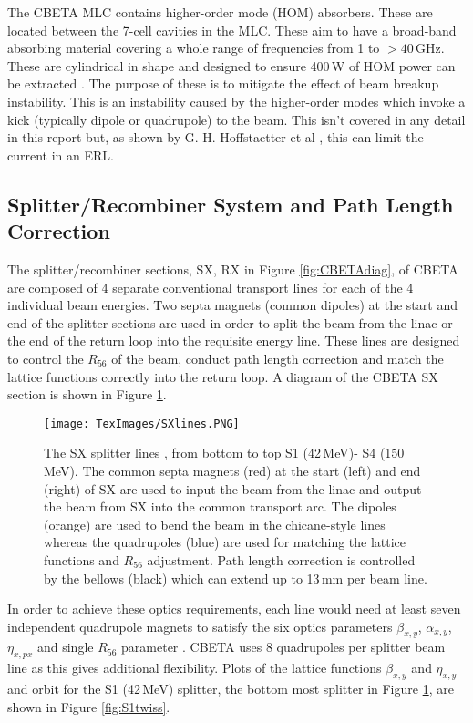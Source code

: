 \documentclass[11pt]{article}
\begin{document}
The CBETA MLC contains higher-order mode (HOM) absorbers. These are located between the 7-cell cavities in the MLC. These aim to have a broad-band absorbing material covering a whole range of frequencies from 1 to $> 40$\,GHz. These are cylindrical in shape and designed to ensure 400\,W of HOM power can be extracted \cite{CBETATDR}. The purpose of these is to mitigate the effect of beam breakup instability. This is an instability caused by the higher-order modes which invoke a kick (typically dipole or quadrupole) to the beam. This isn't covered in any detail in this report but, as shown by G. H. Hoffstaetter et al \cite{HoffstaetterBBU}, this can limit the current in an ERL.    

\subsection{Splitter/Recombiner System and Path Length Correction}

The splitter/recombiner sections, SX, RX in Figure \ref{fig:CBETAdiag}, of CBETA are composed of 4 separate conventional transport lines for each of the 4 individual beam energies. Two septa magnets (common dipoles) at the start and end of the splitter sections are used in order to split the beam from the linac or the end of the return loop into the requisite energy line. These lines are designed to control the $R_{56}$ of the beam, conduct path length correction and match the lattice functions correctly into the return loop. A diagram of the CBETA SX section is shown in Figure \ref{fig:SXlines}.

\begin{figure}[H]
\centering
\texttt{[image: TexImages/SXlines.PNG]}
\caption{\label{fig:SXlines} The SX splitter lines \cite{CBETATDR}, from bottom to top S1 (42\,MeV)- S4 (150\,MeV). The common septa magnets (red) at the start (left) and end (right) of SX are used to input the beam from the linac and output the beam from SX into the common transport arc. The dipoles (orange) are used to bend the beam in the chicane-style lines whereas the quadrupoles (blue) are used for matching the lattice functions and $R_{56}$ adjustment. Path length correction is controlled by the bellows (black) which can extend up to 13\,mm per beam line.}
\end{figure}

In order to achieve these optics requirements, each line would need at least seven independent quadrupole magnets to satisfy the six optics parameters $\beta_{x,y}$, $\alpha_{x,y}$, $\eta_{x, px}$ and single $R_{56}$ parameter \cite{CBETATDR}. CBETA uses 8 quadrupoles per splitter beam line as this gives additional flexibility. Plots of the lattice functions $\beta_{x,y}$ and $\eta_{x,y}$ and orbit for the S1 (42\,MeV) splitter, the bottom most splitter in Figure \ref{fig:SXlines}, are shown in Figure \ref{fig:S1twiss}.
\end{document}
